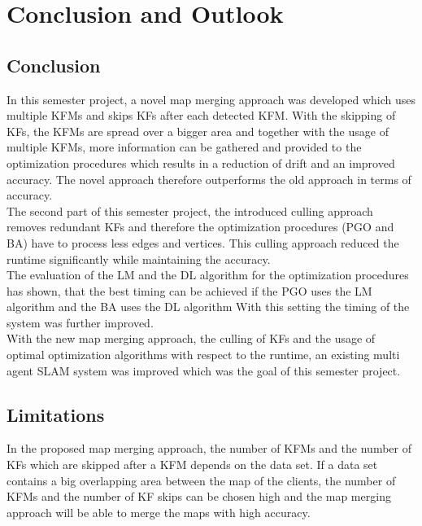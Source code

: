 \chapter{Conclusion and Outlook}

\section{Conclusion}
In this semester project, a novel map merging approach was developed which uses multiple \acp{KFM} and skips \acp{KF} after each detected \ac{KFM}. With the skipping of \acp{KF}, the \acp{KFM} are spread over a bigger area and together with the usage of multiple \acp{KFM}, more information can be gathered and provided to the optimization procedures which results in a reduction of drift and an improved accuracy. The novel approach therefore outperforms the old approach in terms of accuracy.\\

The second part of this semester project, the introduced culling approach removes redundant \acp{KF} and therefore the optimization procedures (\ac{PGO} and \ac{BA}) have to process less edges and vertices. This culling approach reduced the runtime significantly while maintaining the accuracy.\\

The evaluation of the \ac{LM} and the \ac{DL} algorithm for the optimization procedures has shown, that the best timing can be achieved if the \ac{PGO} uses the \ac{LM} algorithm and the \ac{BA} uses the \ac{DL} algorithm With this setting the timing of the system was further improved.\\

With the new map merging approach, the culling of \acp{KF} and the usage of optimal optimization algorithms with respect to the runtime, an existing multi agent \ac{SLAM} system was improved which was the goal of this semester project.

\section{Limitations}
In the proposed map merging approach, the number of \acp{KFM} and the number of \acp{KF} which are skipped after a \ac{KFM} depends on the data set. If a data set contains a big overlapping area between the map of the clients, the number of \acp{KFM} and the number of \ac{KF} skips can be chosen high and the map merging approach will be able to merge the maps with high accuracy.

